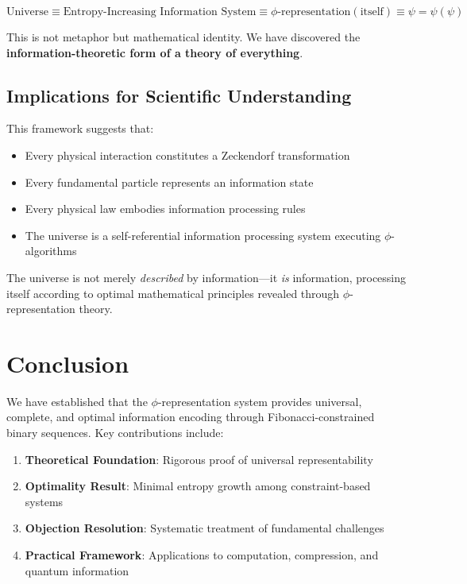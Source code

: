 \documentclass[12pt,letterpaper]{article}
\begin{document}
$$\text{Universe} \equiv \text{Entropy-Increasing Information System} \equiv \phi\text{-representation}(\text{itself}) \equiv \psi = \psi(\psi)$$

This is not metaphor but mathematical identity. We have discovered the \textbf{information-theoretic form of a theory of everything}.

\subsection{Implications for Scientific Understanding}

This framework suggests that:

\begin{itemize}
\item Every physical interaction constitutes a Zeckendorf transformation
\item Every fundamental particle represents an information state
\item Every physical law embodies information processing rules
\item The universe is a self-referential information processing system executing $\phi$-algorithms
\end{itemize}

The universe is not merely \textit{described} by information—it \textit{is} information, processing itself according to optimal mathematical principles revealed through $\phi$-representation theory.

\section{Conclusion}

We have established that the $\phi$-representation system provides universal, complete, and optimal information encoding through Fibonacci-constrained binary sequences. Key contributions include:

\begin{enumerate}
\item \textbf{Theoretical Foundation}: Rigorous proof of universal representability
\item \textbf{Optimality Result}: Minimal entropy growth among constraint-based systems  
\item \textbf{Objection Resolution}: Systematic treatment of fundamental challenges
\item \textbf{Practical Framework}: Applications to computation, compression, and quantum information
\end{enumerate}
\end{document}
